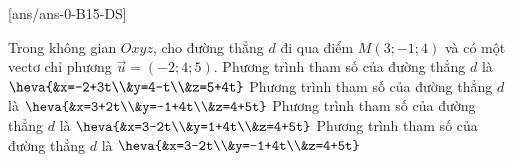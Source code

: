 \TNTF
{}[ans/ans-0-B15-DS]
\setcounter{ex}{13}
\begin{ex}%
	Trong không gian $Oxyz$, cho đường thẳng $d$ đi qua điểm $M(3;-1;4)$ và có một vectơ chỉ phương $\vec{u}=(-2;4;5)$. 
	\choiceTF
	{Phương trình tham số của đường thẳng $d$ là $\heva{&x=-2+3t\\&y=4-t\\&z=5+4t}$}
	{Phương trình tham số của đường thẳng $d$ là $\heva{&x=3+2t\\&y=-1+4t\\&z=4+5t}$}
	{Phương trình tham số của đường thẳng $d$ là $\heva{&x=3-2t\\&y=1+4t\\&z=4+5t}$}
	{\True Phương trình tham số của đường thẳng $d$ là $\heva{&x=3-2t\\&y=-1+4t\\&z=4+5t}$}
\end{ex}
